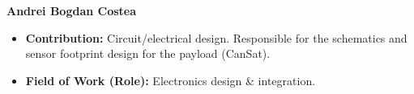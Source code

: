 \item[] \textbf{Andrei Bogdan Costea}
    \begin{itemize}[label=]
        \item[\faEdit] \textbf{Contribution:} Circuit/electrical design. Responsible for the schematics and sensor footprint design for the payload (CanSat).
        \item[\faMicroscope] \textbf{Field of Work (Role):} Electronics design \& integration.
    \end{itemize}
    \vspace{0.2 cm}
    